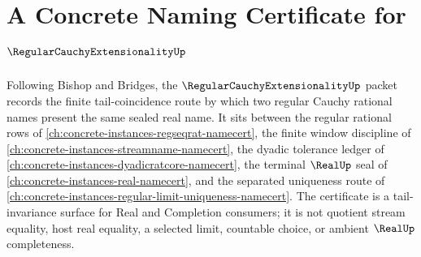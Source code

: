 \chapter{A Concrete Naming Certificate for $\RegularCauchyExtensionalityUp$}
\label{ch:concrete-instances-regular-cauchy-extensionality-namecert}

Following Bishop and Bridges, the $\RegularCauchyExtensionalityUp$ packet records the finite tail-coincidence route by which two regular Cauchy rational names present the same sealed real name. It sits between the regular rational rows of \autoref{ch:concrete-instances-regseqrat-namecert}, the finite window discipline of \autoref{ch:concrete-instances-streamname-namecert}, the dyadic tolerance ledger of \autoref{ch:concrete-instances-dyadicratcore-namecert}, the terminal $\RealUp$ seal of \autoref{ch:concrete-instances-real-namecert}, and the separated uniqueness route of \autoref{ch:concrete-instances-regular-limit-uniqueness-namecert}. The certificate is a tail-invariance surface for Real and Completion consumers; it is not quotient stream equality, host real equality, a selected limit, countable choice, or ambient $\RealUp$ completeness.


